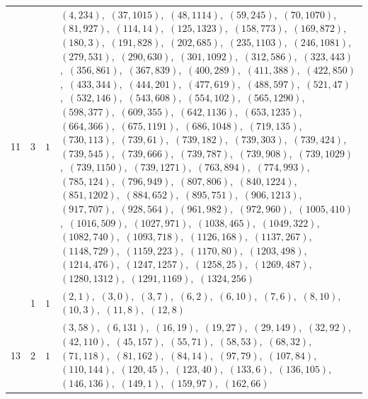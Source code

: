 \documentclass[11pt]{article}
\begin{document}
\begin{longtable}{@{}rrl>{\raggedright\arraybackslash}p{}@{}}
11 & 3 & $1$ & $(4,234)$,\allowbreak\ $(37,1015)$,\allowbreak\ $(48,1114)$,\allowbreak\ $(59,245)$,\allowbreak\ $(70,1070)$,\allowbreak\ $(81,927)$,\allowbreak\ $(114,14)$,\allowbreak\ $(125,1323)$,\allowbreak\ $(158,773)$,\allowbreak\ $(169,872)$,\allowbreak\ $(180,3)$,\allowbreak\ $(191,828)$,\allowbreak\ $(202,685)$,\allowbreak\ $(235,1103)$,\allowbreak\ $(246,1081)$,\allowbreak\ $(279,531)$,\allowbreak\ $(290,630)$,\allowbreak\ $(301,1092)$,\allowbreak\ $(312,586)$,\allowbreak\ $(323,443)$,\allowbreak\ $(356,861)$,\allowbreak\ $(367,839)$,\allowbreak\ $(400,289)$,\allowbreak\ $(411,388)$,\allowbreak\ $(422,850)$,\allowbreak\ $(433,344)$,\allowbreak\ $(444,201)$,\allowbreak\ $(477,619)$,\allowbreak\ $(488,597)$,\allowbreak\ $(521,47)$,\allowbreak\ $(532,146)$,\allowbreak\ $(543,608)$,\allowbreak\ $(554,102)$,\allowbreak\ $(565,1290)$,\allowbreak\ $(598,377)$,\allowbreak\ $(609,355)$,\allowbreak\ $(642,1136)$,\allowbreak\ $(653,1235)$,\allowbreak\ $(664,366)$,\allowbreak\ $(675,1191)$,\allowbreak\ $(686,1048)$,\allowbreak\ $(719,135)$,\allowbreak\ $(730,113)$,\allowbreak\ $(739,61)$,\allowbreak\ $(739,182)$,\allowbreak\ $(739,303)$,\allowbreak\ $(739,424)$,\allowbreak\ $(739,545)$,\allowbreak\ $(739,666)$,\allowbreak\ $(739,787)$,\allowbreak\ $(739,908)$,\allowbreak\ $(739,1029)$,\allowbreak\ $(739,1150)$,\allowbreak\ $(739,1271)$,\allowbreak\ $(763,894)$,\allowbreak\ $(774,993)$,\allowbreak\ $(785,124)$,\allowbreak\ $(796,949)$,\allowbreak\ $(807,806)$,\allowbreak\ $(840,1224)$,\allowbreak\ $(851,1202)$,\allowbreak\ $(884,652)$,\allowbreak\ $(895,751)$,\allowbreak\ $(906,1213)$,\allowbreak\ $(917,707)$,\allowbreak\ $(928,564)$,\allowbreak\ $(961,982)$,\allowbreak\ $(972,960)$,\allowbreak\ $(1005,410)$,\allowbreak\ $(1016,509)$,\allowbreak\ $(1027,971)$,\allowbreak\ $(1038,465)$,\allowbreak\ $(1049,322)$,\allowbreak\ $(1082,740)$,\allowbreak\ $(1093,718)$,\allowbreak\ $(1126,168)$,\allowbreak\ $(1137,267)$,\allowbreak\ $(1148,729)$,\allowbreak\ $(1159,223)$,\allowbreak\ $(1170,80)$,\allowbreak\ $(1203,498)$,\allowbreak\ $(1214,476)$,\allowbreak\ $(1247,1257)$,\allowbreak\ $(1258,25)$,\allowbreak\ $(1269,487)$,\allowbreak\ $(1280,1312)$,\allowbreak\ $(1291,1169)$,\allowbreak\ $(1324,256)$\\
\addlinespace[3pt]
13 & 1 & $1$ & $(2,1)$,\allowbreak\ $(3,0)$,\allowbreak\ $(3,7)$,\allowbreak\ $(6,2)$,\allowbreak\ $(6,10)$,\allowbreak\ $(7,6)$,\allowbreak\ $(8,10)$,\allowbreak\ $(10,3)$,\allowbreak\ $(11,8)$,\allowbreak\ $(12,8)$\\
13 & 2 & $1$ & $(3,58)$,\allowbreak\ $(6,131)$,\allowbreak\ $(16,19)$,\allowbreak\ $(19,27)$,\allowbreak\ $(29,149)$,\allowbreak\ $(32,92)$,\allowbreak\ $(42,110)$,\allowbreak\ $(45,157)$,\allowbreak\ $(55,71)$,\allowbreak\ $(58,53)$,\allowbreak\ $(68,32)$,\allowbreak\ $(71,118)$,\allowbreak\ $(81,162)$,\allowbreak\ $(84,14)$,\allowbreak\ $(97,79)$,\allowbreak\ $(107,84)$,\allowbreak\ $(110,144)$,\allowbreak\ $(120,45)$,\allowbreak\ $(123,40)$,\allowbreak\ $(133,6)$,\allowbreak\ $(136,105)$,\allowbreak\ $(146,136)$,\allowbreak\ $(149,1)$,\allowbreak\ $(159,97)$,\allowbreak\ $(162,66)$\\

\end{longtable}
\end{document}
